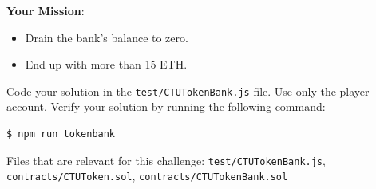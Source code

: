 \documentclass[12pt]{article}
\begin{document}
\medskip
\noindent
\textbf{Your Mission}:
\begin{itemize}
    \item Drain the bank's balance to zero.
    \item End up with more than 15 ETH.
\end{itemize}

\noindent
Code your solution in the \texttt{test/CTUTokenBank.js} file. Use only the player account. Verify your solution by running the following command:

\begin{verbatim}
$ npm run tokenbank
\end{verbatim}

\noindent
Files that are relevant for this challenge: \texttt{test/CTUTokenBank.js}, \texttt{contracts/CTUToken.sol}, \texttt{contracts/CTUTokenBank.sol}
\end{document}
